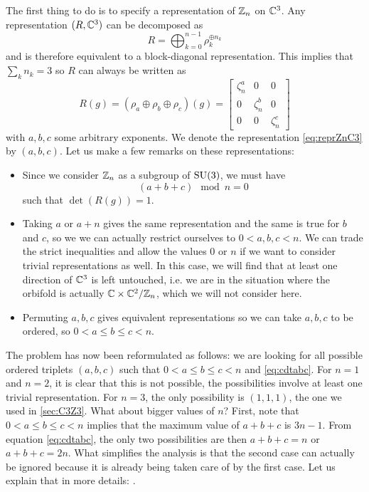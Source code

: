            The first thing to do is to specify a representation of $\mathbb{Z}_n$ on $\mathbb{C}^3$. Any representation $(R,\mathbb{C}^3)$ can be decomposed as
            \begin{equation}
                R=\bigoplus^{n-1}_{k=0} \rho^{\oplus n_k}_k
            \end{equation}
            and is therefore equivalent to a block-diagonal representation. This implies that $\sum_kn_k=3$ so $R$ can always be written as
            \begin{equation}
                R(g)= (\rho_a\oplus\rho_b\oplus\rho_c)(g)=
                \begin{bmatrix}
                    \zeta^a_n & 0 & 0 \\
                    0 & \zeta^b_n & 0 \\
                    0 & 0 & \zeta^c_n
                \end{bmatrix}\label{eq:reprZnC3}
            \end{equation}
            with $a,b,c$ some arbitrary exponents. We denote the representation \eqref{eq:reprZnC3} by $(a,b,c)$. Let us make a few remarks on these representations:
            \begin{itemize}
                \item Since we consider $\mathbb{Z}_n$ as a subgroup of $\text{SU}(3)$, we must have
                \begin{equation}
                    (a+b+c)\mod n = 0\label{eq:cdtabc}
                \end{equation}
                such that $\det(R(g))=1$.
                \item Taking $a$ or $a+n$ gives the same representation and the same is true for $b$ and $c$, so we we can actually restrict ourselves to $0<a,b,c<n$. We can trade the strict inequalities and allow the values $0$ or $n$ if we want to consider trivial representations as well. In this case, we will find that at least one direction of $\mathbb{C}^3$ is left untouched, i.e. we are in the situation where the orbifold is actually $\mathbb{C}\times\mathbb{C}^2/\mathbb{Z}_n$, which we will not consider here.
                \item Permuting $a,b,c$ gives equivalent representations so we can take $a,b,c$ to be ordered, so $0<a\leq b\leq c<n$.
            \end{itemize}

            The problem has now been reformulated as follows:
            we are looking for all possible ordered triplets $(a,b,c)$ such that $0<a\leq b\leq c<n$ and \eqref{eq:cdtabc}. For $n=1$ and $n=2$, it is clear that this is not possible, the possibilities involve at least one trivial representation. For $n=3$, the only possibility is $(1,1,1)$, the one we used in \ref{sec:C3Z3}. What about bigger values of $n$? First, note that $0<a\leq b\leq c<n$ implies that the maximum value of $a+b+c$ is $3n-1$. From equation \eqref{eq:cdtabc}, the only two possibilities are then $a+b+c=n$ or $a+b+c=2n$. What simplifies the analysis is that the second case can actually be ignored because it is already being taken care of by the first case. Let us explain that in more details: .
            
